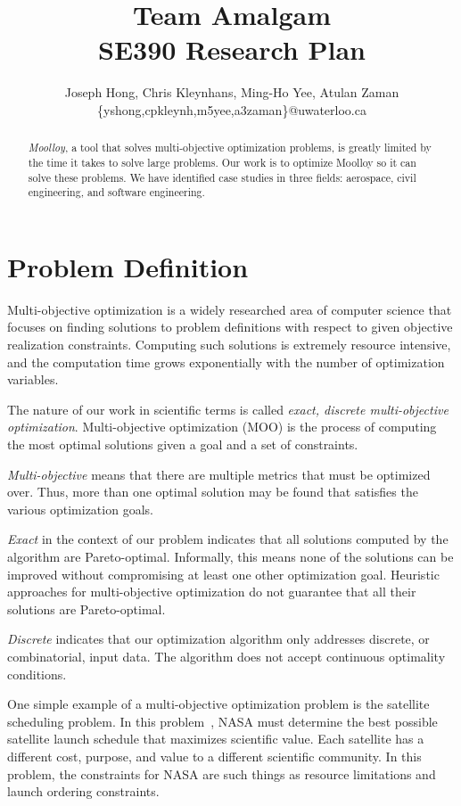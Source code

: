 \documentclass[11pt]{article}
\title{{\Large Team Amalgam} \\ SE390 Research Plan}
\author{Joseph Hong, Chris Kleynhans, Ming-Ho Yee, Atulan Zaman \\
        \{yshong,cpkleynh,m5yee,a3zaman\}@uwaterloo.ca}
\begin{document}
\maketitle

\begin{abstract}
\textit{Moolloy}, a tool that solves multi-objective optimization
problems, is greatly limited by the time it takes to solve large
problems. Our work is to optimize Moolloy so it can solve these
problems. We have identified case studies in three fields: aerospace,
civil engineering, and software engineering.
\end{abstract}

\tableofcontents
\newpage

\section{Problem Definition}
Multi-objective optimization is a widely researched area of computer
science that focuses on finding solutions to problem definitions with
respect to given objective realization constraints. Computing such
solutions is extremely resource intensive, and the computation time
grows exponentially with the number of optimization variables.

The nature of our work in scientific terms is called \textit{exact,
discrete multi-objective optimization}. Multi-objective optimization
(MOO) is the process of computing the most optimal solutions given a
goal and a set of constraints.

\textit{Multi-objective} means that there are multiple metrics that
must be optimized over. Thus, more than one optimal solution may be
found that satisfies the various optimization goals.

\textit{Exact} in the context of our problem indicates that all
solutions computed by the algorithm are Pareto-optimal. Informally,
this means none of the solutions can be improved without compromising
at least one other optimization goal. Heuristic approaches for
multi-objective optimization do not guarantee that all their solutions
are Pareto-optimal.

\textit{Discrete} indicates that our optimization algorithm only
addresses discrete, or combinatorial, input data. The algorithm does
not accept continuous optimality conditions.

One simple example of a multi-objective optimization problem is the
satellite scheduling problem. In this problem~\cite{ref:nasa11}, NASA
must determine the best possible satellite launch schedule that
maximizes scientific value. Each satellite has a different cost,
purpose, and value to a different scientific community. In this
problem, the constraints for NASA are such things as resource
limitations and launch ordering constraints.
\end{document}
